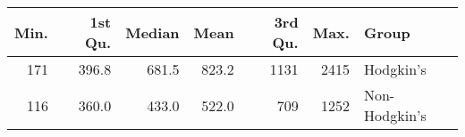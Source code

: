 \begin{table}[ht]
\centering
\begin{tabular}{rrrrrrl}
  \hline
Min. & 1st Qu. & Median & Mean & 3rd Qu. & Max. & Group \\ 
  \hline
171 & 396.8 & 681.5 & 823.2 & 1131 & 2415 & Hodgkin's \\ 
  116 & 360.0 & 433.0 & 522.0 & 709 & 1252 & Non-Hodgkin's \\ 
   \hline
\end{tabular}
\end{table}

